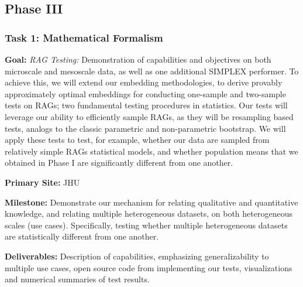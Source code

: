 \subsection{Phase III}



\subsubsection{Task 1: Mathematical Formalism}
\begin{compactitem}
\item \textbf{Goal:} \emph{RAG Testing:} Demonstration of capabilities and objectives on both microscale and mesoscale data, as well as one additional SIMPLEX performer. To achieve this, we will extend our embedding methodologies, to derive provably approximately optimal embeddings for conducting one-sample and two-sample tests on RAGs; two fundamental testing procedures in statistics.  Our tests will leverage our ability to efficiently sample RAGs, as they will be resampling based tests, analogs to the classic parametric and non-parametric bootstrap.  We will apply these tests to test, for example, whether our data are sampled from relatively simple RAGs statistical models, and whether population means that we obtained in Phase I are significantly different from one another.
\item \textbf{Primary Site:} JHU
\item \textbf{Milestone:} Demonstrate our mechanism for relating qualitative and quantitative knowledge, and relating multiple heterogeneous datasets, on both heterogeneous scales (use cases). Specifically, testing whether multiple heterogeneous datasets are statistically different from one another.
\item \textbf{Deliverables:} Description of capabilities, emphasizing generalizability to multiple use cases, open source code from implementing our tests, visualizations and numerical summaries of test results.
\end{compactitem}


